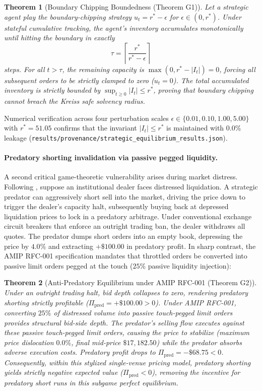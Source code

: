 \documentclass[10pt,twocolumn,letterpaper]{article}
\newtheorem{theorem}{Theorem}[section]
\theoremstyle{definition}
\theoremstyle{remark}
\begin{document}
\begin{theorem}[Boundary Chipping Boundedness (Theorem G1)]
\label{thm:boundary_chipping_bounded}
Let a strategic agent play the boundary-chipping strategy $u_t = r^* - \epsilon$ for $\epsilon \in (0, r^*)$. Under stateful cumulative tracking, the agent's inventory accumulates monotonically until hitting the boundary in exactly
\begin{equation}
\tau = \left\lceil \frac{r^*}{r^* - \epsilon} \right\rceil
\end{equation}
steps. For all $t > \tau$, the remaining capacity is $\max(0, r^* - |I_t|) = 0$, forcing all subsequent orders to be strictly clamped to zero ($u_t = 0$). The total accumulated inventory is strictly bounded by $\sup_{t \ge 0} |I_t| \le r^*$, proving that boundary chipping cannot breach the Kreiss safe solvency radius.
\end{theorem}
Numerical verification across four perturbation scales $\epsilon \in \{0.01, 0.10, 1.00, 5.00\}$ with $r^* = 51.05$ confirms that the invariant $|I_t| \le r^*$ is maintained with $0.0\%$ leakage (\texttt{results/provenance/strategic\_equilibrium\_results.json}).

\paragraph{Predatory shorting invalidation via passive pegged liquidity.}
A second critical game-theoretic vulnerability arises during market distress. Following \citet{brunnermeier2005predatory}, suppose an institutional dealer faces distressed liquidation. A strategic predator can aggressively short sell into the market, driving the price down to trigger the dealer's capacity halt, subsequently buying back at depressed liquidation prices to lock in a predatory arbitrage.
Under conventional exchange circuit breakers that enforce an outright trading ban, the dealer withdraws all quotes. The predator dumps short orders into an empty book, depressing the price by $4.0\%$ and extracting $+\$100.00$ in predatory profit.
In sharp contrast, the AMIP RFC-001 specification mandates that throttled orders be converted into passive limit orders pegged at the touch ($25\%$ passive liquidity injection):
\begin{theorem}[Anti-Predatory Equilibrium under AMIP RFC-001 (Theorem G2)]
\label{thm:anti_predatory}
Under an outright trading halt, bid depth collapses to zero, rendering predatory shorting strictly profitable ($\Pi_{\text{pred}} = +\$100.00 > 0$). Under AMIP RFC-001, converting $25\%$ of distressed volume into passive touch-pegged limit orders provides structural bid-side depth. The predator's selling flow executes against these passive touch-pegged limit orders, causing the price to stabilize (maximum price dislocation $0.0\%$, final mid-price $\$17{,}182.50$) while the predator absorbs adverse execution costs. Predatory profit drops to $\Pi_{\text{pred}} = -\$68.75 < 0$. Consequently, within this stylized single-venue pricing model, predatory shorting yields strictly negative expected value ($\Pi_{\text{pred}} < 0$), removing the incentive for predatory short runs in this subgame perfect equilibrium.
\end{theorem}
\end{document}
